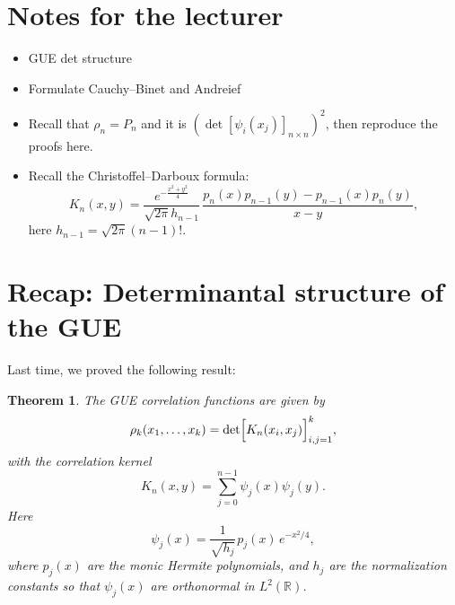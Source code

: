 \documentclass[letterpaper,11pt,oneside,reqno]{book}
\numberwithin{equation}{chapter}  %
\newcommand{\ssp}{\hspace{1pt}}
\newtheorem{theorem}[proposition]{Theorem}
\theoremstyle{definition}
\newenvironment{lnotes}{\section*{Notes for the lecturer}}{}
\begin{document}
\begin{lnotes}

\begin{itemize}
	\item GUE det structure

	\item Formulate Cauchy--Binet and Andreief

	\item Recall that $\rho_n=P_n$ and it is
	$\left( \det[\psi_i(x_j)]_{n\times n} \right)^2$, then reproduce the proofs here.

	\item Recall the Christoffel--Darboux formula:
	\begin{equation*}
		K_n(x,y)=\frac{e^{-\frac{x^2+y^2}{4}}}{\sqrt{2\pi}
		h_{n-1}}\,\frac{p_n(x)p_{n-1}(y)-p_{n-1}(x)p_n(y)}{x-y},
	\end{equation*}
	here $h_{n-1}=\sqrt{2\pi}(n-1)!$.
\end{itemize}

\end{lnotes}

\section{Recap: Determinantal structure of the GUE}

Last time, we proved the following result:
\begin{theorem}
\label{lecture6:thm:determinantal_GUE}
The GUE correlation functions are given by
\[
\rho_k(x_1,\dots,x_k)=\det\Bigl[K_n(x_i,x_j)\Bigr]_{i,j=1}^k,
\]
with the correlation kernel
\[
K_n(x,y)=\sum_{j=0}^{n-1}\psi_j(x)\psi_j(y).
\]
Here
\begin{equation*}
	\psi_j(x)=\frac{1}{\sqrt{h_j}}\ssp p_j(x)\,e^{-x^2/4},
\end{equation*}
where \(p_j(x)\) are the monic Hermite polynomials, and \(h_j\) are the normalization constants so that
$\psi_j(x)$ are orthonormal in $L^2(\mathbb{R})$.
\end{theorem}
\end{document}
